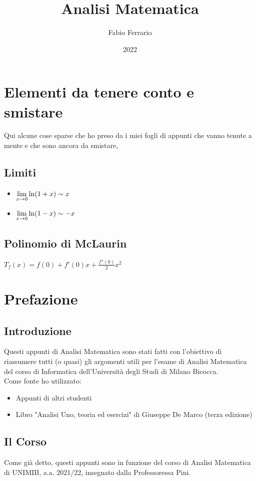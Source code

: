 \documentclass[12pt, a4paper, openany]{book}
\begin{document}


\title{Analisi Matematica}
\author{Fabio Ferrario}
\date{2022}
\maketitle

\tableofcontents
\chapter*{Elementi da tenere conto e smistare}
Qui alcune cose sparse che ho preso da i miei fogli di appunti che vanno tenute a mente e che sono ancora da smistare,
\section{Limiti}
\begin{itemize}
    \item $\underset{x \to 0}{\lim} \ln(1+x) \sim x$
    \item $\underset{x \to 0}{\lim} \ln(1-x) \sim -x$
\end{itemize}
\section{Polinomio di McLaurin}
$T_f(x) = f(0) + f'(0)x + \frac{f''(0)}{2}x^2$
\chapter*{Prefazione}
\section{Introduzione}
Questi appunti di Analisi Matematica sono stati fatti con l'obiettivo di riassumere tutti (o quasi) gli argomenti utili per l'esame di Analisi Matematica del corso di Informatica dell'Università degli Studi di Milano Bicocca.
\\Come fonte ho utilizzato:
\begin{itemize}
    \item Appunti di altri studenti
    \item Libro "Analisi Uno, teoria ed esercizi" di Giuseppe De Marco (terza edizione) 
\end{itemize}
\section{Il Corso}
Come già detto, questi appunti sono in funzione del corso di Analisi Matematica di UNIMIB, a.a. 2021/22, insegnato dalla Professoressa Pini.
\end{document}
